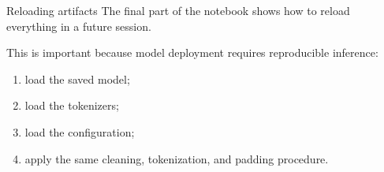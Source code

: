 \documentclass[aspectratio=169]{beamer}
\begin{document}
%
%
\begin{frame}[fragile]{Reloading artifacts}
The final part of the notebook shows how to reload everything in a future session.

\vspace{0.3cm}
This is important because model deployment requires reproducible inference:
\begin{enumerate}
    \item load the saved model;
    \item load the tokenizers;
    \item load the configuration;
    \item apply the same cleaning, tokenization, and padding procedure.
\end{enumerate}
\end{frame}
%
\end{document}
